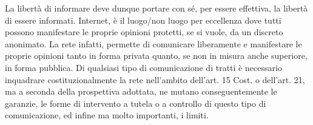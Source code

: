 La libertà di informare deve dunque portare con sé, per essere effettiva, la libertà di essere informati. Internet, è il luogo/non luogo per eccellenza dove tutti possono  manifestare le proprie opinioni protetti, se si vuole, da un discreto anonimato. La rete infatti, permette di comunicare liberamente e manifestare le proprie opinioni tanto in forma privata quanto, se non in misura anche superiore, in forma pubblica.
Di qualsiasi tipo di comunicazione di tratti è necessario inquadrare costituzionalmente la rete nell'ambito dell'art. 15 Cost. o dell'art. 21, ma a seconda della prospettiva adottata, ne mutano conseguentemente le garanzie, le forme di intervento a tutela o a controllo di questo tipo di comunicazione, ed infine ma molto importanti, i limiti. %
